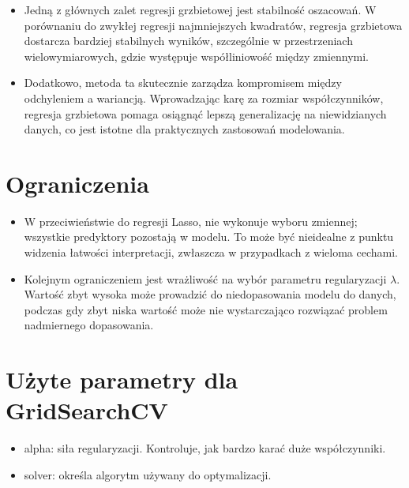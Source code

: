 \begin{itemize}
\item Jedną z głównych zalet regresji grzbietowej jest stabilność oszacowań. W porównaniu do zwykłej regresji najmniejszych kwadratów, regresja grzbietowa dostarcza bardziej stabilnych wyników, szczególnie w przestrzeniach wielowymiarowych, gdzie występuje współliniowość między zmiennymi. 

\item Dodatkowo, metoda ta skutecznie zarządza kompromisem między odchyleniem a wariancją. Wprowadzając karę za rozmiar współczynników, regresja grzbietowa pomaga osiągnąć lepszą generalizację na niewidzianych danych, co jest istotne dla praktycznych zastosowań modelowania.
\end{itemize}

{}
\section*{Ograniczenia}
\vspace{-1.0em}
\label{sec:ml_challenges}


\begin{itemize}
\item W przeciwieństwie do regresji Lasso, nie wykonuje wyboru zmiennej; wszystkie predyktory pozostają w modelu. To może być nieidealne z punktu widzenia łatwości interpretacji, zwłaszcza w przypadkach z wieloma cechami.

\item Kolejnym ograniczeniem jest wrażliwość na wybór parametru regularyzacji $\lambda$. Wartość zbyt wysoka może prowadzić do niedopasowania modelu do danych, podczas gdy zbyt niska wartość może nie wystarczająco rozwiązać problem nadmiernego dopasowania.
\end{itemize}

{}
\section*{Użyte parametry dla GridSearchCV \cite{url_Ridge, url_grid_search}}
\vspace{-1.0em}
\label{sec:ml_challenges}

\begin{itemize}
\item {alpha}: siła regularyzacji. Kontroluje, jak bardzo karać duże współczynniki.

\item {solver}: określa algorytm używany do optymalizacji.
\end{itemize}
\noindent\makebox[\linewidth]{\rule{\paperwidth}{0.4pt}}